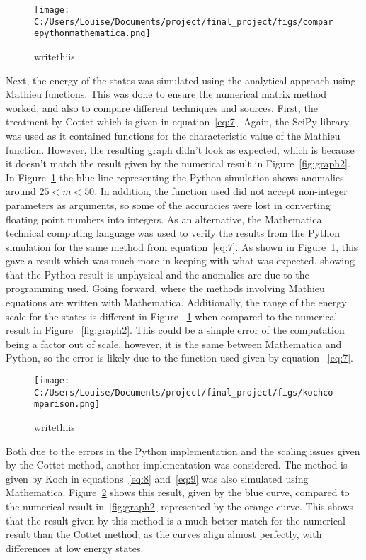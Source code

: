 \documentclass[11pt]{article}
\begin{document}
\begin{figure}[ht]
\centering
\texttt{[image: C:/Users/Louise/Documents/project/final\_project/figs/comparepythonmathematica.png]}
\caption{writethiis}
\label{fig:graph3}
\end{figure}
Next, the energy of the states was simulated using the analytical approach using Mathieu functions. This was done to ensure the numerical matrix method worked, and also to compare different techniques and sources. First, the treatment by Cottet which is given in equation~\ref{eq:7}. Again, the SciPy library was used as it contained functions for the characteristic value of the Mathieu function. However, the resulting graph didn't look as expected, which is because it doesn't match the result given by the numerical result in Figure~\ref{fig:graph2}. In Figure~\ref{fig:graph3} the blue line representing the Python simulation shows anomalies around $25 < m < 50$. In addition, the function used did not accept non-integer parameters as arguments, so some of the accuracies were lost in converting floating point numbers into integers. As an alternative, the Mathematica technical computing language was used to verify the results from the Python simulation for the same method from equation~\ref{eq:7}. As shown in Figure~\ref{fig:graph3}, this gave a result which was much more in keeping with what was expected. showing that the Python result is unphysical and the anomalies are due to the programming used. Going forward, where the methods involving Mathieu equations are written with Mathematica.
Additionally, the range of the energy scale for the states is different in Figure ~\ref{fig:graph3} when compared to the numerical result in Figure ~\ref{fig:graph2}. This could be a simple error of the computation being a factor out of scale, however, it is the same between Mathematica and Python, so the error is likely due to the function used given by equation ~\ref{eq:7}.
\begin{figure}[ht]
\centering
\texttt{[image: C:/Users/Louise/Documents/project/final\_project/figs/kochcomparison.png]}
\caption{writethiis}
\label{fig:graph4}
\end{figure}
Both due to the errors in the Python implementation and the scaling issues given by the Cottet method, another implementation was considered. The method is given by Koch in equations~\ref{eq:8} and~\ref{eq:9} was also simulated using Mathematica. Figure~\ref{fig:graph4} shows this result, given by the blue curve, compared to the numerical result in~\ref{fig:graph2} represented by the orange curve. This shows that the result given by this method is a much better match for the numerical result than the Cottet method, as the curves align almost perfectly, with differences at low energy states.
\end{document}

